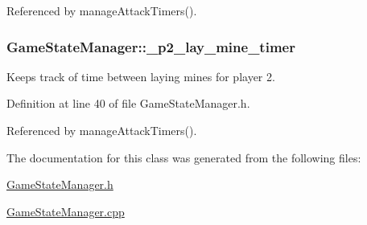 Referenced by manage\-Attack\-Timers().

\hypertarget{classGameStateManager_a14203d39640e3368bc75c2e9b853a452}{
\subsubsection[{\-\_\-p2\-\_\-lay\-\_\-mine\-\_\-timer}]{ Game\-State\-Manager\-::\-\_\-p2\-\_\-lay\-\_\-mine\-\_\-timer\hspace{0.3cm}{\ttfamily [private]}}}\label{classGameStateManager_a14203d39640e3368bc75c2e9b853a452}


Keeps track of time between laying mines for player 2. 



Definition at line 40 of file Game\-State\-Manager.\-h.



Referenced by manage\-Attack\-Timers().



The documentation for this class was generated from the following files\-:\begin{DoxyCompactItemize}
\item 
\hyperlink{GameStateManager_8h}{Game\-State\-Manager.\-h}\item 
\hyperlink{GameStateManager_8cpp}{Game\-State\-Manager.\-cpp}\end{DoxyCompactItemize}
